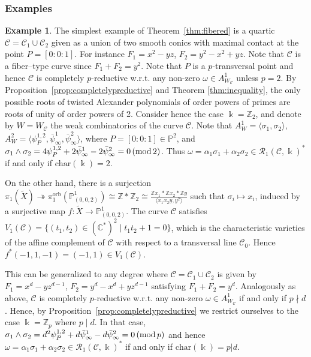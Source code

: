 \documentclass[11pt]{amsart}
\DeclareMathOperator{\orb}{orb}
\def\cC{\mathcal{C}}
\def\cR{{\mathcal R}}
\def\ZZ{\mathbb{Z}}
\def\CC{\mathbb{C}}
\def\PP{\mathbb{P}}
\def\kk{\Bbbk}
\def\w{\omega}
\def\surj{\mathbin{\twoheadrightarrow}}
\theoremstyle{plain}
\theoremstyle{definition}
\newtheorem{example}[thm]{Example}
\begin{document}
\subsubsection{Examples}
\label{subsec:ex_resonance}

\begin{example}
\label{exam:conics}
The simplest example of Theorem~\ref{thm:fibered} is  a quartic $\cC=\cC_1\cup\cC_2$ given as
a union of two smooth conics with maximal contact at the point $P= [0:0:1]$. For instance $F_1=x^2-yz$, $F_2=y^2-x^2+yz$. Note that
$\cC$ is a fiber--type curve since $F_1+F_2=y^2$. Note that $P$ is a $p$-transversal point and hence $\cC$ is completely $p$-reductive 
w.r.t. any non-zero $\w\in A^1_{W_\cC}$
unless $p=2$. By Proposition~\ref{prop:completelypreductive} and Theorem \ref{thm:inequality}, the only possible roots of twisted Alexander polynomials of order powers of primes are roots of unity of order powers of 2.
Consider hence the case $\kk=\ZZ_2$, and denote by $W=W_\cC$ the weak combinatorics of the curve $\cC$. Note that $A_W^1=\langle \sigma_1,\sigma_2\rangle$,
$A_W^2=\langle \psi_P^{1,2},\bar \psi^1_\infty,\bar\psi^2_\infty\rangle$, where $P=[0:0:1]\in\PP^2$,
and $\sigma_1\wedge\sigma_2=4\psi_P^{1,2}+2\bar\psi^1_\infty-2\bar\psi^2_\infty=0 \, ({\rm mod} \, 2)$. Thus
$\omega=\alpha_1\sigma_1+\alpha_2\sigma_2\in \cR_1(\cC,\kk)^*$ if and only if $\mathrm{char}(\kk)=2$.

On the other hand, there is a surjection
$\pi_1(\tilde X)\surj \pi_1^{\orb} (\PP^1_{(0,0,2)})\cong\ZZ *\ZZ_2\cong \frac{\ZZ x_1*\ZZ x_2 *\ZZ y}{\langle x_1x_2y,y^2\rangle}$
such that $\sigma_i\mapsto x_i$, induced by a surjective map $f: \tilde X \rightarrow \PP^1_{(0,0,2)}$. The curve $\cC$ satisfies $V_1(\cC)=\{(t_1,t_2)\in (\CC^*)^2\mid t_1t_2+1=0\}$, which is the characteristic varieties of the affine complement of $\cC$ with respect to a transversal line $\cC_0$. Hence $f^*(-1,1,-1)=(-1,1)\in V_1(\cC)$.

This can be generalized to any degree where $\cC=\cC_1\cup\cC_2$ is given by $F_1=x^d-yz^{d-1}$, $F_2=y^d-x^d+yz^{d-1}$ satisfying $F_1+F_2=y^d$. Analogously as above, $\cC$ is completely $p$-reductive 
w.r.t. any non-zero $\w\in A^1_{W_\cC}$
if and only if $p\nmid d$. Hence, by Proposition~\ref{prop:completelypreductive} we restrict ourselves to the case $\kk=\ZZ_p$ where $p\mid d$. In that case, $\sigma_1\wedge\sigma_2=d^2\psi_P^{1,2}+d\bar\psi^1_\infty-d\bar\psi^2_\infty=0 \, ({\rm mod}\,  p)$ and hence $\omega=\alpha_1\sigma_1+\alpha_2\sigma_2\in \cR_1(\cC,\kk)^*$ if and only if $\mathrm{char}(\kk)=p|d$.
\end{example}
\end{document}

